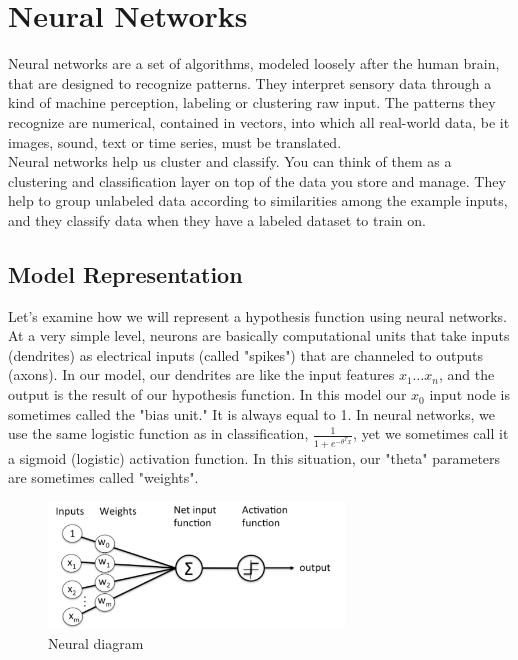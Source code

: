 \chapter{Neural Networks}

Neural networks are a set of algorithms, modeled loosely after the human brain, that are designed to recognize patterns. They interpret sensory data through a kind of machine perception, labeling or clustering raw input. The patterns they recognize are numerical, contained in vectors, into which all real-world data, be it images, sound, text or time series, must be translated.\\

Neural networks help us cluster and classify. You can think of them as a clustering and classification layer on top of the data you store and manage. They help to group unlabeled data according to similarities among the example inputs, and they classify data when they have a labeled dataset to train on. \\

\section{Model Representation}

Let's examine how we will represent a hypothesis function using neural networks. At a very simple level, neurons are basically computational units that take inputs (dendrites) as electrical inputs (called "spikes") that are channeled to outputs (axons). In our model, our dendrites are like the input features $x_1\dots x_n$, and the output is the result of our hypothesis function. In this model our $ x_0 $ input node is sometimes called the "bias unit." It is always equal to 1. In neural networks, we use the same logistic function as in classification, $ \frac{1}{1 + e^{-\theta^Tx}} $, yet we sometimes call it a sigmoid (logistic) activation function. In this situation, our "theta" parameters are sometimes called "weights".\\

\begin{figure}[h!]
	\centering
	\includegraphics[width=0.7\textwidth]{fig/neural_diag}
	\caption{Neural diagram}
\end{figure}

